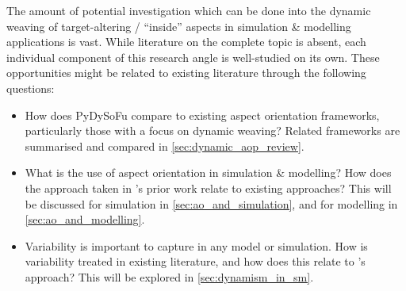 
The amount of potential investigation which can be done into the dynamic weaving
of target-altering / ``inside'' aspects in simulation \& modelling applications
is vast. While literature on the complete topic is absent, each individual
component of this research angle is well-studied on its own. These opportunities
might be related to existing literature through the following questions:

\begin{itemize}
    \item How does PyDySoFu compare to existing aspect orientation frameworks,
    particularly those with a focus on dynamic weaving? Related frameworks are
    summarised and compared in \cref{sec:dynamic_aop_review}.

    \item What is the use of aspect orientation in simulation \& modelling? How
    does the approach taken in \pdsf's prior work relate to existing
    approaches? This will be discussed for simulation in
    \cref{sec:ao_and_simulation}, and for modelling in
    \cref{sec:ao_and_modelling}.
    
    \item Variability is important to capture in any \sociotechnical model or
    simulation. How is variability treated in existing literature, and how does
    this relate to \pdsf's approach? This will be explored in
    \cref{sec:dynamism_in_sm}.
\end{itemize}


